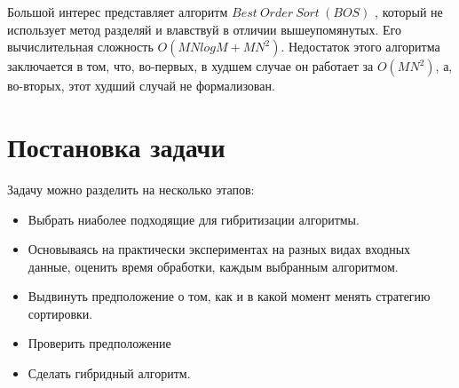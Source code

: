 Большой интерес представляет алгоритм $Best~Order~Sort~(BOS)$ \cite{BOS}, который не использует метод разделяй и влавствуй в отличии вышеупомянутых. Его вычислительная сложность $O(MNlogM+MN^2)$. Недостаток этого алгоритма заключается в том, что, во-первых, в худшем случае он работает за $O(MN^2)$, а, во-вторых, этот худший случай не формализован.

\section{Постановка задачи}

Задачу можно разделить на несколько этапов: 
\begin{itemize}
	\item Выбрать ниаболее подходящие для гибритизации алгоритмы.
	\item Основываясь на практически экспериментах на разных видах входных данные, оценить время обработки, каждым выбранным алгоритмом. 	
	\item Выдвинуть предположение о том, как и в какой момент менять стратегию сортировки. 
	\item Проверить предположение
	\item Сделать гибридный алгоритм.
\end{itemize} 